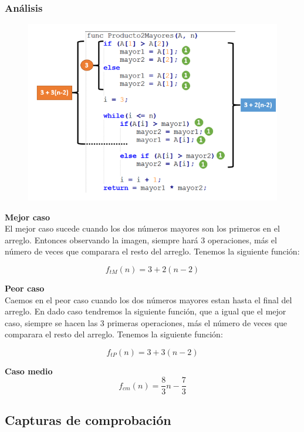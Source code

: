 \documentclass[12pt]{article}
\begin{document}
    		\subsubsection{Análisis}
    		
	    		\begin{figure}[h!]
	                \centering
	                \includegraphics[width=\textwidth]{Abigail/Images/EJER9.PNG}
	 		    \end{figure} 

    			\textbf{Mejor caso} \\
    			\noindent El mejor caso sucede cuando los dos números mayores son los primeros en el arreglo. Entonces observando la imagen, siempre hará $3$ operaciones, más el número de veces que comparara el resto del arreglo. Tenemos la siguiente función:

    			$$
    				f_{tM}(n) = 3 + 2(n - 2)
    			$$

    			\textbf{Peor caso} \\
    			\noindent Caemos en el peor caso cuando los dos números mayores estan hasta el final del arreglo. En dado caso tendremos la siguiente función, que a igual que el mejor caso, siempre se hacen las $3$ primeras operaciones, más el número de veces que comparara el resto del arreglo. Tenemos la siguiente función:

    			$$
    				f_{tP}(n) = 3 + 3(n - 2)	
    			$$
				
				\textbf{Caso medio} \\
				$$ f_{cm}(n) = \frac{8}{3}n - \frac{7}{3} $$
				\noindent 

	        \subsection{Capturas de comprobación}
\end{document}
